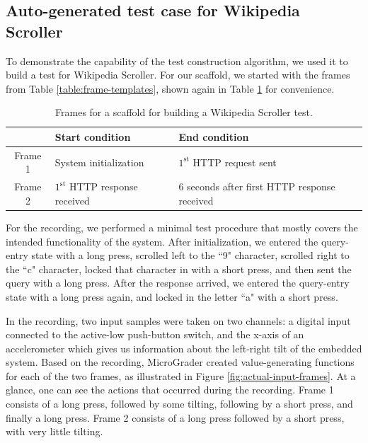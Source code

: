 \documentclass[12pt]{article}
\begin{document}
\subsection{Auto-generated test case for Wikipedia Scroller}
To demonstrate the capability of the test construction algorithm, we used it to build a test for Wikipedia Scroller.  For our scaffold, we started with the frames from Table \ref{table:frame-templates}, shown again in Table \ref{table:frame-templates-2} for convenience.

\begin{table}[ht]
\begin{center}
\vspace{2mm}
\begin{tabular}{c|ll}
& Start condition & End condition \\ \hline
Frame 1 & System initialization & $1^{\text{st}}$ HTTP request sent \\
Frame 2 & $1^{\text{st}}$ HTTP response received & 6 seconds after first HTTP response received \\ \hline
\end{tabular}
\caption{Frames for a scaffold for building a Wikipedia Scroller test.}
\label{table:frame-templates-2}
\end{center}
\end{table}

For the recording, we performed a minimal test procedure that mostly covers the intended functionality of the system.  After initialization, we entered the query-entry state with a long press, scrolled left to the ``9" character, scrolled right to the ``c" character, locked that character in with a short press, and then sent the query with a long press.  After the response arrived, we entered the query-entry state with a long press again, and locked in the letter ``a" with a short press.

In the recording, two input samples were taken on two channels: a digital input connected to the active-low push-button switch, and the x-axis of an accelerometer which gives us information about the left-right tilt of the embedded system.  Based on the recording, MicroGrader created value-generating functions for each of the two frames, as illustrated in Figure \ref{fig:actual-input-frames}.  At a glance, one can see the actions that occurred during the recording. Frame 1 consists of a long press, followed by some tilting, following by a short press, and finally a long press.  Frame 2 consists of a long press followed by a short press, with very little tilting.
\end{document}

